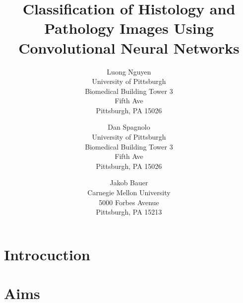 \documentclass[10pt,twocolumn,letterpaper]{article}
\begin{document}
\title
{
    Classification of Histology and Pathology Images Using Convolutional Neural
    Networks%
}

\author{%
    Luong Nguyen\\
    University of Pittsburgh\\
    Biomedical Building Tower 3\\
    Fifth Ave\\
    Pittsburgh, PA 15026\\
    \and
    Dan Spagnolo\\
    University of Pittsburgh\\
    Biomedical Building Tower 3\\
    Fifth Ave\\
    Pittsburgh, PA 15026\\
    \and
    Jakob Bauer\\
    Carnegie Mellon University\\
    5000 Forbes Avenue\\
    Pittsburgh, PA 15213\\
}

\maketitle




\section{Introcuction}
\label{sec:Introcuction}

\section{Aims}
\label{sec:Aims}
\end{document}
